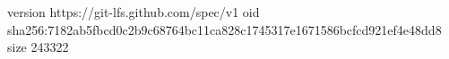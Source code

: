 version https://git-lfs.github.com/spec/v1
oid sha256:7182ab5fbcd0c2b9c68764bc11ca828c1745317e1671586bcfcd921ef4e48dd8
size 243322
